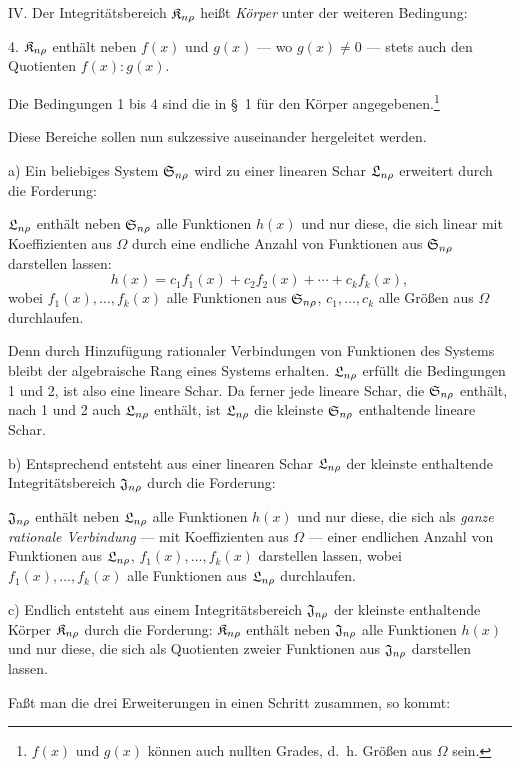 IV. Der Integritätsbereich $\mathfrak{K}_{n\rho}$ heißt \emph{Körper} unter der weiteren Bedingung:

4. $\mathfrak{K}_{n\rho}$ enthält neben $f(x)$ und $g(x)$ --- wo $g(x)\ne0$ --- stets auch den Quotienten $f(x):g(x)$.

Die Bedingungen 1 bis 4 sind die in \S\ 1 für den Körper angegebenen.\footnote{$f(x)$ und $g(x)$ können auch nullten Grades, d.~h. Größen aus $\Omega$ sein.}

Diese Bereiche sollen nun sukzessive auseinander hergeleitet werden.

a) Ein beliebiges System $\mathfrak{S}_{n\rho}$ wird zu einer linearen Schar $\mathfrak{L}_{n\rho}$ erweitert durch die Forderung:

$\mathfrak{L}_{n\rho}$ enthält neben $\mathfrak{S}_{n\rho}$ alle Funktionen $h(x)$ und nur diese, die sich linear mit Koeffizienten aus $\Omega$ durch eine endliche Anzahl von Funktionen aus $\mathfrak{S}_{n\rho}$ darstellen lassen:
\[
  h(x)=c_1f_1(x)+c_2f_2(x)+\cdots+c_kf_k(x),
\]
wobei $f_1(x),\ldots,f_k(x)$ alle Funktionen aus $\mathfrak{S}_{n\rho}$, $c_1,
\ldots,c_k$ alle Größen aus $\Omega$ durchlaufen.

Denn durch Hinzufügung rationaler Verbindungen von Funktionen des Systems bleibt der algebraische Rang eines Systems erhalten. $\mathfrak{L}_{n\rho}$ erfüllt die Bedingungen 1 und 2, ist also eine lineare Schar. Da ferner jede lineare Schar, die $\mathfrak{S}_{n\rho}$ enthält, nach 1 und 2 auch $\mathfrak{L}_{n\rho}$ enthält, ist $\mathfrak{L}_{n\rho}$ die kleinste $\mathfrak{S}_{n\rho}$ enthaltende lineare Schar.

b) Entsprechend entsteht aus einer linearen Schar $\mathfrak{L}_{n\rho}$ der kleinste enthaltende Integritätsbereich $\mathfrak{J}_{n\rho}$ durch die Forderung:

$\mathfrak{J}_{n\rho}$ enthält neben $\mathfrak{L}_{n\rho}$ alle Funktionen $h(x)$ und nur diese, die sich als \emph{ganze rationale Verbindung} --- mit Koeffizienten aus $\Omega$ --- einer endlichen Anzahl von Funktionen aus $\mathfrak{L}_{n\rho}$, $f_1(x),\ldots,f_k(x)$ darstellen lassen, wobei $f_1(x),\ldots,f_k(x)$ alle Funktionen aus $\mathfrak{L}_{n\rho}$ durchlaufen.

c) Endlich entsteht aus einem Integritätsbereich $\mathfrak{J}_{n\rho}$ der kleinste enthaltende Körper $\mathfrak{K}_{n\rho}$ durch die Forderung: $\mathfrak{K}_{n\rho}$ enthält neben $\mathfrak{J}_{n\rho}$ alle Funktionen $h(x)$ und nur diese, die sich als Quotienten zweier Funktionen aus $\mathfrak{J}_{n\rho}$ darstellen lassen.

Faßt man die drei Erweiterungen in einen Schritt zusammen, so kommt:

